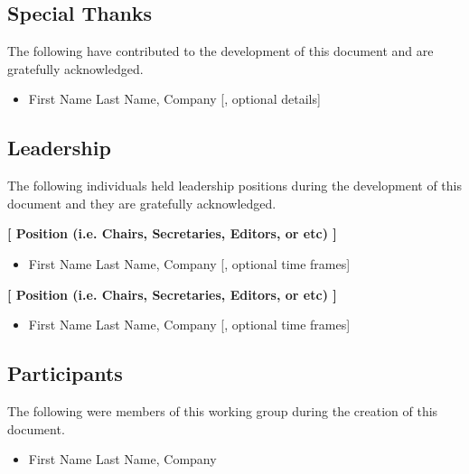 
\OTHTAcknowledgment

\subsection{Special Thanks}
\OTHTSpecialThanks

The following have contributed to the development of this document and are gratefully acknowledged.

\begin{itemize}
  \item First Name Last Name, Company [, optional details]
\end{itemize}

\subsection{Leadership}
\OTHTLeadership

The following individuals held leadership positions during the development of this document and they are gratefully acknowledged.

\textbf{[ Position (i.e. Chairs, Secretaries, Editors, or etc) ]}
\NoParSkip
\begin{itemize}
  \item First Name Last Name, Company [, optional time frames]
\end{itemize}

\textbf{[ Position (i.e. Chairs, Secretaries, Editors, or etc) ]}
\NoParSkip
\begin{itemize}
  \item First Name Last Name, Company [, optional time frames]
\end{itemize}

\subsection{Participants}
\OTHTParticipants

The following were members of this working group during the creation of this document.

\begin{itemize}
  \item First Name Last Name, Company
\end{itemize}
